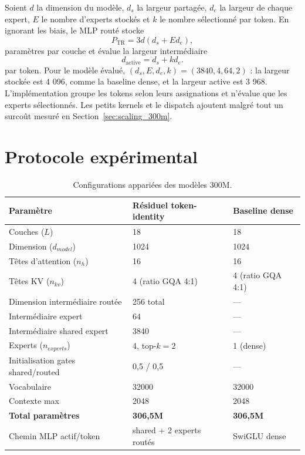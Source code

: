 \documentclass[10pt]{article}
\theoremstyle{definition}
\theoremstyle{remark}
\begin{document}
Soient $d$ la dimension du mod\`{e}le, $d_s$ la largeur partag\'{e}e, $d_e$ la largeur de chaque expert, $E$ le nombre d'experts stock\'{e}s et $k$ le nombre s\'{e}lectionn\'{e} par token. En ignorant les biais, le MLP rout\'{e} stocke
\begin{equation}
P_{\mathrm{TR}}=3d(d_s+E d_e),
\end{equation}
param\`{e}tres par couche et \'{e}value la largeur interm\'{e}diaire
\begin{equation}
d_{\mathrm{active}}=d_s+k d_e.
\end{equation}
par token. Pour le mod\`{e}le \'{e}valu\'{e}, $(d_s,E,d_e,k)=(3840,4,64,2)$ : la largeur stock\'{e}e est 4 096, comme la baseline dense, et la largeur active est 3 968. L'impl\'{e}mentation groupe les tokens selon leurs assignations et n'\'{e}value que les experts s\'{e}lectionn\'{e}s. Les petits kernels et le dispatch ajoutent malgr\'{e} tout un surco\^{u}t mesur\'{e} en Section~\ref{sec:scaling_300m}.


\section{Protocole exp\'{e}rimental}
\label{sec:experiments}

\begin{table}[h]
\centering
\caption{Configurations appari\'{e}es des mod\`{e}les 300M.}
\label{tab:config_300m}
\begin{tabular}{lll}
\toprule
\textbf{Param\`{e}tre} & \textbf{R\'{e}siduel token-identity} & \textbf{Baseline dense} \\
\midrule
Couches ($L$) & 18 & 18 \\
Dimension ($d_{model}$) & 1024 & 1024 \\
T\^{e}tes d'attention ($n_h$) & 16 & 16 \\
T\^{e}tes KV ($n_{kv}$) & 4 (ratio GQA 4:1) & 4 (ratio GQA 4:1) \\
Dimension interm\'{e}diaire rout\'{e}e & 256 total & --- \\
Interm\'{e}diaire expert & 64 & --- \\
Interm\'{e}diaire shared expert & 3840 & --- \\
Experts ($n_{experts}$) & 4, top-$k=2$ & 1 (dense) \\
Initialisation gates shared/routed & 0,5 / 0,5 & --- \\
Vocabulaire & 32000 & 32000 \\
Contexte max & 2048 & 2048 \\
\midrule
\textbf{Total param\`{e}tres} & \textbf{306,5M} & \textbf{306,5M} \\
Chemin MLP actif/token & shared + 2 experts rout\'{e}s & SwiGLU dense \\
\bottomrule
\end{tabular}
\end{table}
\end{document}
